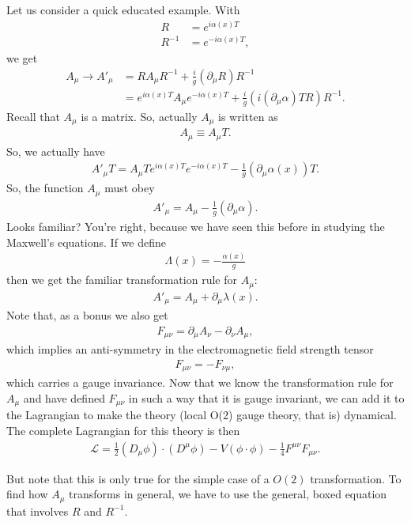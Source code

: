 \documentclass[a4paper,11pt]{article}
\numberwithin{equation}{section}
\theoremstyle{definition}
\newcommand{\p}{\partial}
\newcommand{\lag}{\mathcal{L}}
\begin{document}
Let us consider a quick educated example. With
\begin{align}
R &= e^{i\alpha(x)T}\\
R^{-1} &= e^{-i\alpha(x)T},
\end{align}
we get
\begin{align}
A_\mu \to A'_\mu &= RA_\mu R^{-1} + \frac{i}{g}(\p_\mu R)R^{-1}\\
&= e^{i\alpha(x)T}A_\mu e^{-i\alpha(x)T} + \frac{i}{g}\left(i(\p_\mu\alpha)TR\right)R^{-1}.
\end{align}
Recall that $A_\mu$ is a matrix. So, actually $A_\mu$ is written as
\begin{align}
A_\mu \equiv A_\mu T.
\end{align}
So, we actually have
\begin{align}
A'_\mu T = A_\mu T e^{i\alpha(x)T}e^{-i\alpha(x)T} - \frac{1}{g}(\p_\mu\alpha(x))T.
\end{align}
So, the function $A_\mu$ must obey
\begin{align}
A'_\mu = A_\mu - \frac{1}{g}(\p_\mu\alpha).
\end{align}
Looks familiar? You're right, because we have seen this before in studying the Maxwell's equations. If we define
\begin{align}
\Lambda(x) = - \frac{\alpha(x)}{g}
\end{align}
then we get the familiar transformation rule for $A_\mu$:
\begin{align}
A'_\mu = A_\mu + \p_\mu \lambda(x).
\end{align}
Note that, as a bonus we also get
\begin{align}
F_{\mu\nu} = \p_\mu A_\nu - \p_\nu A_\mu,
\end{align}
which implies an anti-symmetry in the electromagnetic field strength tensor
\begin{align}
F_{\mu\nu} = -F_{\nu\mu},
\end{align}
which carries a gauge invariance. Now that we know the transformation rule for $A_\mu$ and have defined $F_{\mu\nu}$ in such a way that it is gauge invariant, we can add it to the Lagrangian to make the theory (local O(2) gauge theory, that is) dynamical. The complete Lagrangian for this theory is then
\begin{align}
\lag = \frac{1}{2}(D_\mu\phi)\cdot(D^\mu\phi) - V(\phi\cdot\phi) - \frac{1}{4}F^{\mu\nu}F_{\mu\nu}.
\end{align}


But note that this is only true for the simple case of a $O(2)$ transformation. To find how $A_\mu$ transforms in general, we have to use the general, boxed equation that involves $R$ and $R^{-1}$. 
\end{document}
